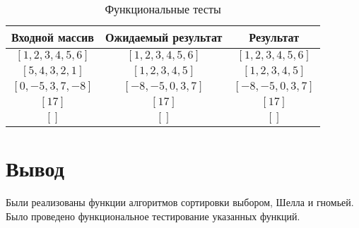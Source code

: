 \begin{table}[h]
	\begin{center}
		\caption{\label{tbl:func-tests} Функциональные тесты}
		\begin{tabular}{|c|c|c|}
			\hline
			Входной массив & Ожидаемый результат & Результат \\ 
			\hline
			$[1, 2, 3, 4, 5, 6]$ & $[1, 2, 3, 4, 5, 6]$  & $[1, 2, 3, 4, 5, 6]$\\
			$[5, 4, 3, 2, 1]$  & $[1, 2, 3, 4, 5]$ & $[1, 2, 3, 4, 5]$\\
			$[0, -5, 3, 7, -8]$  & $[-8, -5, 0, 3, 7]$  & $[-8, -5, 0, 3, 7]$\\
			$[17]$  & $[17]$  & $[17]$\\
			$[]$  & $[]$  & $[]$\\
			\hline
		\end{tabular}
	\end{center}
\end{table}

\section*{Вывод}

Были реализованы функции алгоритмов сортировки выбором, Шелла и гномьей. Было проведено функциональное тестирование указанных функций.